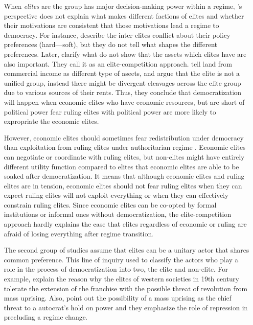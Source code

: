 \documentclass[11pt]{article}
\begin{document}
When \emph{elites} are the group has major decision-making power within a regime, \citet{ODonnell1986}'s perspective does not explain what makes different factions of elites and whether their motivations are consistent that those motivations lead a regime to democracy. For instance, \citet{ODonnell1986} describe the inter-elites conflict about their policy preferences (hard---soft), but they do not tell what shapes the different preferences. Later, \citet{Ansell2015a} clarify what \citet{ODonnell1986} do not show that the assets which elites have are also important. They call it as an elite-competition approach. \citet{Ansell2015a} tell land from commercial income as different type of aseets, and argue that the elite is not a unified group, instead there might be divergent cleavages across the elite group due to various sources of their rents. Thus, they conclude that democratization will happen when economic elites who have economic resources, but are short of political power fear ruling elites with political power are more likely to expropriate the economic elites.

However, economic elites should sometimes fear redistribution under democracy than exploitation from ruling elites under authoritarian regime \citep{Albertus2014}. Economic elites can negotiate or coordinate with ruling elites, but non-elites might have entirely different utility function compared to elites that economic elites are able to be soaked after democratization. It means that although economic elites and ruling elites are in tension, economic elites should not fear ruling elites when they can expect ruling elites will not exploit everything or when they can effectively constrain ruling elites. Since economic elites can be co-opted by formal institutions \citet{Schedler2002a, Wright2008, Gandhi2007, Gandhi2009} or informal ones without democratization, the elite-competition approach hardly explains the case that elites regardless of economic or ruling are afraid of losing everything after regime transition.

The second group of studies assume that elites can be a unitary actor that shares common preference. This line of inquiry used to classify the actors who play a role in the process of democratization into two, the elite and non-elite. For example, \citet{Acemoglu2000} explain the reason why the elites of western societies in 19th century tolerate the extension of the franchise with the possible threat of revolution from mass uprising. Also, \citet{Acemoglu2001} point out the possibility of a mass uprising as the chief threat to a autocrat's hold on power and they emphasize the role of repression in precluding a regime change.
\end{document}

